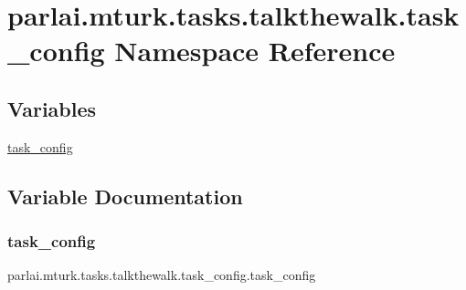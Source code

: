 \hypertarget{namespaceparlai_1_1mturk_1_1tasks_1_1talkthewalk_1_1task__config}{}\section{parlai.\+mturk.\+tasks.\+talkthewalk.\+task\+\_\+config Namespace Reference}
\label{namespaceparlai_1_1mturk_1_1tasks_1_1talkthewalk_1_1task__config}
\subsection*{Variables}
\begin{DoxyCompactItemize}
\item 
\hyperlink{namespaceparlai_1_1mturk_1_1tasks_1_1talkthewalk_1_1task__config_ac62d8b2b9895fab13d6d344c109df514}{task\+\_\+config}
\end{DoxyCompactItemize}


\subsection{Variable Documentation}
\mbox{\label{namespaceparlai_1_1mturk_1_1tasks_1_1talkthewalk_1_1task__config_ac62d8b2b9895fab13d6d344c109df514}} 
\subsubsection{\texorpdfstring{task\+\_\+config}{task\_config}}
{\footnotesize\ttfamily parlai.\+mturk.\+tasks.\+talkthewalk.\+task\+\_\+config.\+task\+\_\+config}


